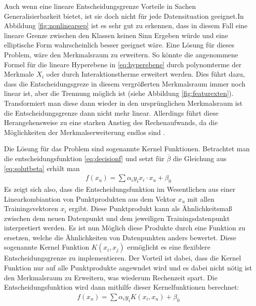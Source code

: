 \documentclass[
]{article}
\begin{document}
Auch wenn eine lineare Entscheidungsgrenze Vorteile in Sachen
Generalisierbarkeit bietet, ist sie doch nicht für jede Datensituation
geeignet.In Abbildung \ref{fig:nonlinearsep} ist es sehr gut zu
erkennen, dass in diesem Fall eine lineare Grenze zwischen den Klassen
keinen Sinn Ergeben würde und eine elliptische Form wahrscheinlich
besser geeignet wäre. Eine Lösung für dieses Problem, wäre den
Merkmalsraum zu erweitern. So könnte die angenommene Formel für die
lineare Hyperebene in \eqref{eq:hyperebene} durch polynomterme der
Merkmale \(X_i\) oder durch Interaktionstherme erweitert werden. Dies
führt dazu, dass die Entscheidungsgreze in diesem vergrößerten
Merkmalsraum immer noch linear ist, aber die Trennung möglich ist (siehe
Abbildung \ref{fig:featurexten}). Transformiert man diese dann wieder in
den ursprünglichen Merkmalsraum ist die Entscheidungsgrenze dann nicht
mehr linear. Allerdings führt diese Herangehensweise zu eine starken
Anstieg des Rechenaufwands, da die Möglichkeiten der Merkmalserweiterung
endlos sind \parencite{jamesIntroductionStatisticalLearning2021}.

Die Lösung für das Problem sind sogenannte Kernel Funktionen. Betrachtet
man die entscheidungsfunktion \eqref{eq:decisionf} und setzt für
\(\overline{\beta}\) die Gleichung aus \eqref{eq:solutbeta} erhält man
\begin{align}
f(x_u)= \sum \alpha_i y_i x_i \cdot x_u +\beta_0
\end{align} Es zeigt sich also, dass die Entscheidungsfunktion im
Wesentlichen aus einer Linearkombiantion von Punktprodukten aus dem
Vektor \(x_u\) mit allen Trainingsvektoren \(x_i\) ergibt. Diese
Punktprodukt kann als Ähnlichkeitsmaß zwischen dem neuen Datenpunkt und
dem jeweiligen Trainingsdatenpunkt interpretiert werden. Es ist nun
Möglich diese Produkte durch eine Funktion zu ersetzen, welche die
Ähnlichkeiten von Datenpunkten anders bewertet. Diese sogenannte Kernel
Funktion \(K(x_i,x_j)\) ermöglicht es eine flexiblere
Entscheidungsgrenze zu implementieren. Der Vorteil ist dabei, dass die
Kernel Funktion nur auf alle Punktprodukte angewndet wird und es dabei
nicht nötig ist den Merkmalsraum zu Erweitern, was wiederum Rechenzeit
spart\parencite{jamesIntroductionStatisticalLearning2021}. Die
Entscheidungsfunktion wird dann mithilfe dieser Kernelfunktionen
berechnet: \begin{align}
  f(x_u)=\sum \alpha_i y_i K(x_i,x_u)+\beta_0
\end{align}
\end{document}
